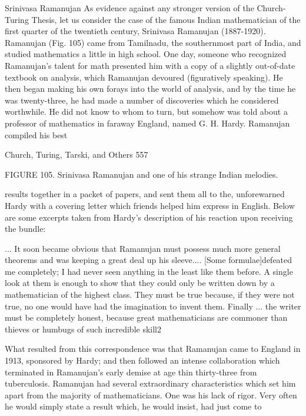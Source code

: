 {                                Srinivasa Ramanujan
As evidence against any stronger version of the Church-Turing Thesis, let us consider the
case of the famous Indian mathematician of the first quarter of the twentieth century,
Srinivasa Ramanujan (1887-1920). Ramanujan (Fig. 105) came from Tamilnadu, the
southernmost part of India, and studied mathematics a little in high school. One day,
someone who recognized Ramanujan's talent for math presented him with a copy of a
slightly out-of-date textbook on analysis, which Ramanujan devoured (figuratively
speaking). He then began making his own forays into the world of analysis, and by the
time he was twenty-three, he had made a number of discoveries which he considered
worthwhile. He did not know to whom to turn, but somehow was told about a professor
of mathematics in faraway England, named G. H. Hardy. Ramanujan compiled his best




Church, Turing, Tarski, and Others                                                       557

                                                 FIGURE 105. Srinivasa Ramanujan and
                                                 one of his strange Indian melodies.




results together in a packet of papers, and sent them all to the, unforewarned Hardy with a
covering letter which friends helped him express
in English. Below are some excerpts taken from Hardy's description of his reaction upon
receiving the bundle:

   ... It soon became obvious that Ramanujan must possess much more general
   theorems and was keeping a great deal up his sleeve.... [Some formulae]defeated
   me completely; I had never seen anything in the least like them before. A single
   look at them is enough to show that they could only be written down by a
   mathematician of the highest class. They must be true because, if they were not
   true, no one would have had the imagination to invent them. Finally ... the writer
   must be completely honest, because great mathematicians are commoner than
   thieves or humbugs of such incredible skill2

What resulted from this correspondence was that Ramanujan came to England in 1913,
sponsored by Hardy; and then followed an intense collaboration which terminated in
Ramanujan's early demise at age thin thirty-three from tuberculosis.
        Ramanujan had several extraordinary characteristics which set him apart from the
majority of mathematicians. One was his lack of rigor. Very often he would simply state
a result which, he would insist, had just come to




}
